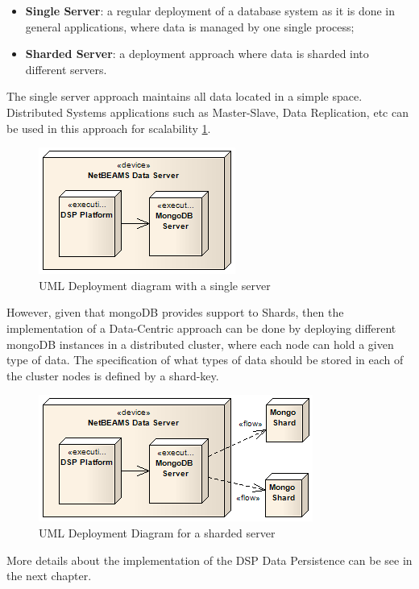 \begin{itemize}
  \item \textbf{Single Server}: a regular deployment of a database system as it
  is done in general applications, where data is managed by one single process;
  \item \textbf{Sharded Server}: a deployment approach where data is sharded
  into different servers.
\end{itemize} 

The single server approach maintains all data located in a simple space.
Distributed Systems applications such as Master-Slave, Data Replication, etc
can be used in this approach for scalability
\ref{fig:DSP-Data-Persistence-Deployment-Single}. 

\begin{figure}[!b]
  \centering
  \includegraphics[scale=0.7]{../diagrams/DSP-Data-Persistence-Deployment-Single}
  \caption{UML Deployment diagram with a single server}
  \label{fig:DSP-Data-Persistence-Deployment-Single}
\end{figure}

However, given that mongoDB provides support to Shards, then the implementation
of a Data-Centric approach can be done by deploying different mongoDB instances
in a distributed cluster, where each node can hold a given type of data. The
specification of what types of data should be stored in each of the cluster
nodes is defined by a shard-key.

\begin{figure}[!b]
  \centering
  \includegraphics[scale=0.7]{../diagrams/DSP-Data-Persistence-Deployment-Sharded}
  \caption{UML Deployment Diagram for a sharded server}
  \label{fig:DSP-Data-Persistence-Deployment-Sharded}
\end{figure}

More details about the implementation of the DSP Data Persistence can be see in
the next chapter.
